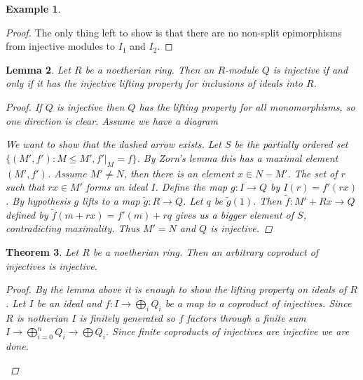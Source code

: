 \documentclass[11pt, a4paper, english]{article}
\newtheorem{theorem}{Theorem}[section]
\newtheorem{lemma}[theorem]{Lemma}
\theoremstyle{definition}
\newtheorem{example}[theorem]{Example}
\begin{document}
\begin{example}
\begin{proof}
		The only thing left to show is that there are no non-split epimorphisms from injective modules to $I_1$ and $I_2$.
	\end{proof}
\end{example}

\begin{lemma}\cite[Chapter I, theorem 3.2]{CE56} \label{lem:injectives_for_noetherian_ring}
	Let $R$ be a noetherian ring. Then an $R$-module $Q$ is injective if and only if it has the injective lifting property for inclusions of ideals into $R$.
	\begin{proof}
		If $Q$ is injective then $Q$ has the lifting property for all monomorphisms, so one direction is clear. Assume we have a diagram
		\begin{center}
		\end{center}
		We want to show that the dashed arrow exists. Let $S$ be the partially ordered set $\{(M', f'): M \leq M', f'|_M = f\}$. By Zorn's lemma this has a maximal element $(M', f')$. Assume $M' \neq N$, then there is an element $x \in N - M'$. The set of $r$ such that $rx \in M'$ forms an ideal $I$. Define the map $g: I \to Q$ by $I(r) = f'(rx)$. By hypothesis $g$ lifts to a map $\tilde{g}:R \to Q$. Let $q$ be $\tilde{g}(1)$. Then $\tilde{f}: M' + Rx \to Q$ defined by $\tilde{f}(m + rx) = f'(m) + rq$ gives us a bigger element of $S$, contradicting maximality. Thus $M'=N$ and $Q$ is injective.
	\end{proof}
\end{lemma}

\begin{theorem}
	Let $R$ be a noetherian ring. Then an arbitrary coproduct of injectives is injective.
	\begin{proof}
		By the lemma above it is enough to show the lifting property on ideals of $R$. Let $I$ be an ideal and $f:I \to \bigoplus_i Q_i$ be a map to a coproduct of injectives. Since $R$ is notherian $I$ is finitely generated so $f$ factors through a finite sum $I \to \bigoplus_{i=0}^n Q_i \to \bigoplus Q_i$. Since finite coproducts of injectives are injective we are done.
		\begin{center}
		\end{center}
	\end{proof}
\end{theorem}
\end{document}
